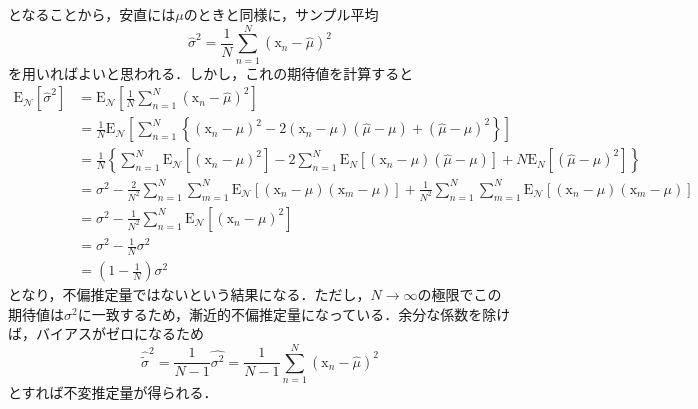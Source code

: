 \documentclass[a4paper,11pt]{jsreport}
\begin{document}
となることから，安直には$\mu$のときと同様に，サンプル平均
\begin{equation}
  \hat{\sigma}^2
  = \frac{1}{N} \sum_{n=1}^N (\mathrm{x}_n - \hat{\mu})^2
\end{equation}
を用いればよいと思われる．しかし，これの期待値を計算すると
\begin{align*}
  \mathrm{E}_\mathcal{N}\left[\hat{\sigma}^2\right]
   & =\mathrm{E}_\mathcal{N}\left[\frac{1}{N} \sum_{n=1}^N\left(\mathrm{x}_n-\hat{\mu}\right)^2\right]                                                                                                                                       \\
   & =\frac{1}{N} \mathrm{E}_\mathcal{N}\left[\sum_{n=1}^N\left\{\left(\mathrm{x}_n-\mu\right)^2-2\left(\mathrm{x}_n-\mu\right)(\hat{\mu}-\mu)+(\hat{\mu}-\mu)^2\right\}\right]                                                                       \\
   & =\frac{1}{N}\left\{\sum_{n=1}^N \mathrm{E}_\mathcal{N}\left[\left(\mathrm{x}_n-\mu\right)^2\right]-2 \sum_{n=1}^N \mathrm{E}_N\left[\left(\mathrm{x}_n-\mu\right)(\hat{\mu}-\mu)\right]+N \mathrm{E}_N\left[(\hat{\mu}-\mu)^2\right]\right\}                       \\
   & =\sigma^2-\frac{2}{N^2} \sum_{n=1}^N \sum_{m=1}^N \mathrm{E}_\mathcal{N}\left[\left(\mathrm{x}_n-\mu\right)\left(\mathrm{x}_m-\mu\right)\right]+\frac{1}{N^2} \sum_{n=1}^N \sum_{m=1}^N \mathrm{E}_\mathcal{N}\left[\left(\mathrm{x}_n-\mu\right)\left(\mathrm{x}_m-\mu\right)\right] \\
   & =\sigma^2-\frac{1}{N^2} \sum_{n=1}^N \mathrm{E}_\mathcal{N}\left[\left(\mathrm{x}_n-\mu\right)^2\right]                                                                                                                                 \\
   & =\sigma^2-\frac{1}{N} \sigma^2                                                                                                                                                                              \\
   & =\left(1-\frac{1}{N}\right) \sigma^2
\end{align*}
となり，不偏推定量ではないという結果になる．ただし，$N \rightarrow \infty$の極限でこの期待値は$\sigma^2$に一致するため，漸近的不偏推定量になっている．余分な係数を除けば，バイアスがゼロになるため
\begin{equation}
  \hat{\tilde{\sigma}}^2 
  = \frac{1}{N - 1} \hat{\sigma^2} = \frac{1}{N - 1} \sum_{n=1}^N (\mathrm{x}_n - \hat{\mu})^2
\end{equation}
とすれば不変推定量が得られる．
\end{document}
